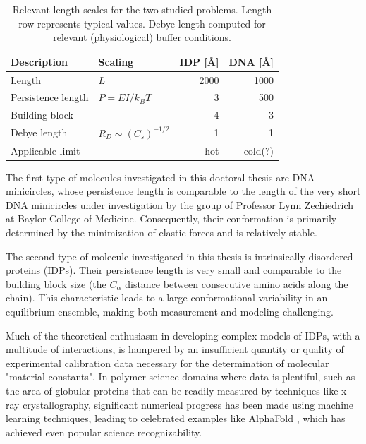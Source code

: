 \documentclass{doctoral}
\begin{document}
\begin{table}[htbp]
    \centering
    \begin{tabular}{llrr}
        \toprule
        \textbf{Description} &
        \textbf{Scaling}     &
        \textbf{IDP [\AA]}   &
        \textbf{DNA [\AA]}                                              \\
        \midrule
        Length               & $L$                     & 2000 & 1000    \\
        Persistence length   & $P = EI / k_B T$        & 3    & 500     \\
        Building block       &                         & 4    & 3       \\
        Debye length         & $R_D \sim (C_s)^{-1/2}$ & 1    & 1       \\
        \midrule
        Applicable limit     &                         & hot  & cold(?) \\
        \bottomrule
    \end{tabular}
    \caption{Relevant length scales for the two studied problems.
        Length row represents typical values.
        Debye length computed for relevant (physiological) buffer conditions.
    } \label{tab:lengthscales}
\end{table}

The first type of molecules investigated in this doctoral thesis are DNA minicircles, whose persistence length is comparable to the length of the very short DNA minicircles under investigation by the group of Professor Lynn Zechiedrich at Baylor College of Medicine.
Consequently, their conformation is primarily determined by the minimization of elastic forces and is relatively stable.

The second type of molecule investigated in this thesis is intrinsically disordered proteins (IDPs).
Their persistence length is very small and comparable to the building block size (the $C_\alpha$ distance between consecutive amino acids along the chain).
This characteristic leads to a large conformational variability in an equilibrium ensemble, making both measurement and modeling challenging.

Much of the theoretical enthusiasm in developing complex models of IDPs, with a multitude of interactions, is hampered by an insufficient quantity or quality of experimental calibration data necessary for the determination of molecular "material constants".
In polymer science domains where data is plentiful, such as the area of globular proteins that can be readily measured by techniques like x-ray crystallography, significant numerical progress has been made using machine learning techniques, leading to celebrated examples like AlphaFold \cite{Jumper_2021}, which has achieved even popular science recognizability.
\end{document}
